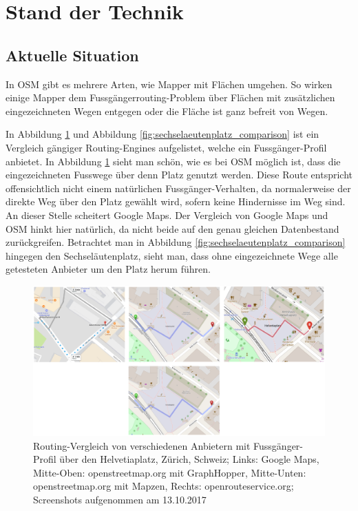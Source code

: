\section{Stand der Technik}
\label{sec:Stand der Technik}

\subsection{Aktuelle Situation}
\label{sub:Aktuelle Situation}

In \ac{OSM} gibt es mehrere Arten, wie Mapper mit Flächen umgehen. So wirken einige Mapper dem Fussgängerrouting-Problem über Flächen mit zusätzlichen eingezeichneten Wegen entgegen oder die Fläche ist ganz befreit von Wegen.

In Abbildung \ref{fig:helvetiaplatz_comparison} und Abbildung \ref{fig:sechselaeutenplatz_comparison} ist ein Vergleich gängiger Routing-Engines aufgelistet, welche ein Fussgänger-Profil anbietet. In Abbildung \ref{fig:helvetiaplatz_comparison} sieht man schön, wie es bei \ac{OSM} möglich ist, dass die eingezeichneten Fusswege über denn Platz genutzt werden. Diese Route entspricht offensichtlich nicht einem natürlichen Fussgänger-Verhalten, da normalerweise der direkte Weg über den Platz gewählt wird, sofern keine Hindernisse im Weg sind. An dieser Stelle scheitert Google Maps. Der Vergleich von Google Maps und \ac{OSM} hinkt hier natürlich, da nicht beide auf den genau gleichen Datenbestand zurückgreifen. Betrachtet man in Abbildung \ref{fig:sechselaeutenplatz_comparison} hingegen den Sechseläutenplatz, sieht man, dass ohne eingezeichnete Wege alle getesteten Anbieter um den Platz herum führen.

\begin{figure}[ht]
\centering
\includegraphics[width=1\linewidth]{technicalreport/img/helvetiaplatz_comparison}
\caption[Fussgänger-Routing Vergleich]{Routing-Vergleich von verschiedenen Anbietern mit Fussgänger-Profil über den Helvetiaplatz, Zürich, Schweiz; Links: Google Maps, Mitte-Oben: openstreetmap.org mit GraphHopper, Mitte-Unten: openstreetmap.org mit Mapzen, Rechts: openrouteservice.org; Screenshots aufgenommen am 13.10.2017}
\label{fig:helvetiaplatz_comparison}
\end{figure}

